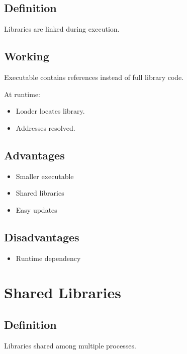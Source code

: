 \subsection{Definition}

Libraries are linked during execution.

\subsection{Working}

Executable contains references instead of full library code.

At runtime:

\begin{itemize}
\item Loader locates library.
\item Addresses resolved.
\end{itemize}

\subsection{Advantages}

\begin{itemize}
\item Smaller executable
\item Shared libraries
\item Easy updates
\end{itemize}

\subsection{Disadvantages}

\begin{itemize}
\item Runtime dependency
\end{itemize}

\section{Shared Libraries}

\subsection{Definition}

Libraries shared among multiple processes.

